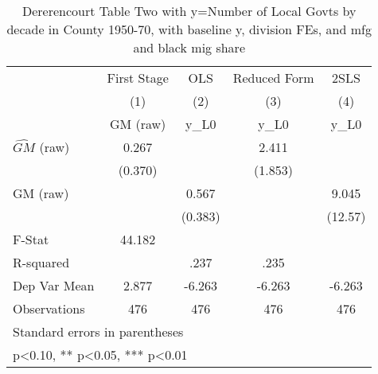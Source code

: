 \begin{table}[htbp]\centering
\def\sym#1{\ifmmode^{#1}\else\(^{#1}\)\fi}
\caption{Dererencourt Table Two with y=Number of Local Govts by decade in County 1950-70, with baseline y, division FEs, and mfg and black mig share}
\begin{tabular}{l*{4}{c}}
\toprule
                    & First Stage   &         OLS   &Reduced Form   &        2SLS   \\
                    &\multicolumn{1}{c}{(1)}&\multicolumn{1}{c}{(2)}&\multicolumn{1}{c}{(3)}&\multicolumn{1}{c}{(4)}\\
                    &\multicolumn{1}{c}{GM  (raw)}&\multicolumn{1}{c}{y\_L0}&\multicolumn{1}{c}{y\_L0}&\multicolumn{1}{c}{y\_L0}\\
\midrule
$\hat{GM}$ (raw)    &       0.267   &               &       2.411   &               \\
                    &     (0.370)   &               &     (1.853)   &               \\
\addlinespace
GM  (raw)           &               &       0.567   &               &       9.045   \\
                    &               &     (0.383)   &               &     (12.57)   \\
\midrule
F-Stat              &      44.182   &               &               &               \\
R-squared           &               &        .237   &        .235   &               \\
Dep Var Mean        &       2.877   &      -6.263   &      -6.263   &      -6.263   \\
Observations        &         476   &         476   &         476   &         476   \\
\bottomrule
\multicolumn{5}{l}{\footnotesize Standard errors in parentheses}\\
\multicolumn{5}{l}{\footnotesize * p<0.10, ** p<0.05, *** p<0.01}\\
\end{tabular}
\end{table}
